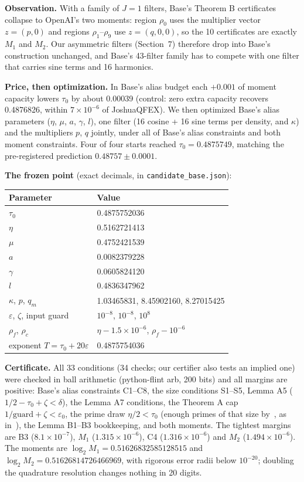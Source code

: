 \documentclass[11pt]{article}
\newcommand{\eps}{\varepsilon}
\theoremstyle{plain}
\begin{document}
\textbf{Observation.} With a family of $J = 1$ filters, Base's Theorem B certificates collapse to OpenAI's two moments: region $\rho_0$ uses the multiplier vector $z = (p, 0)$ and regions $\rho_1$--$\rho_9$ use $z = (q, 0, 0)$, so the 10 certificates are exactly $M_1$ and $M_2$. Our asymmetric filters (Section~7) therefore drop into Base's construction unchanged, and Base's 43-filter family has to compete with one filter that carries sine terms and 16 harmonics.

\textbf{Price, then optimization.} In Base's alias budget each $+0.001$ of moment capacity lowers $\tau_0$ by about 0.00039 (control: zero extra capacity recovers 0.4876826, within $7\times10^{-6}$ of JoshuaQFEX). We then optimized Base's alias parameters ($\eta$, $\mu$, $a$, $\gamma$, $l$), one filter (16 cosine + 16 sine terms per density, and $\kappa$) and the multipliers $p$, $q$ jointly, under all of Base's alias constraints and both moment constraints. Four of four starts reached $\tau_0 = 0.4875749$, matching the pre-registered prediction $0.48757 \pm 0.0001$.

\textbf{The frozen point} (exact decimals, in \texttt{candidate\_base.json}):

\begin{center}
\small
\begin{tabular}{ll}
\toprule
Parameter & Value \\
\midrule
$\tau_0$ & 0.4875752036 \\
$\eta$ & 0.5162721413 \\
$\mu$ & 0.4752421539 \\
$a$ & 0.0082379228 \\
$\gamma$ & 0.0605824120 \\
$l$ & 0.4836347962 \\
$\kappa$, $p$, $q_m$ & 1.03465831, 8.45902160, 8.27015425 \\
$\eps$, $\zeta$, input guard & $10^{-8}$, $10^{-8}$, $10^{8}$ \\
$\rho_f$, $\rho_c$ & $\eta - 1.5\times10^{-6}$, $\rho_f - 10^{-6}$ \\
exponent $T = \tau_0 + 20\eps$ & 0.4875754036 \\
\bottomrule
\end{tabular}
\end{center}

\textbf{Certificate.} All 33 conditions (34 checks; our certifier also tests an implied one) were checked in ball arithmetic (python-flint arb, 200 bits) and all margins are positive: Base's alias constraints C1--C8, the size conditions S1--S5, Lemma A5 ($1/2 - \tau_0 + \zeta < \delta$), the Lemma A7 conditions, the Theorem A cap $1/\mathrm{guard} + \zeta < \eps_0$, the prime draw $\eta/2 < \tau_0$ (enough primes of that size by~\cite[Cor.~3]{rs}, as in~\cite{openai}), the Lemma B1--B3 bookkeeping, and both moments. The tightest margins are B3 ($8.1\times10^{-7}$), $M_1$ ($1.315\times10^{-6}$), C4 ($1.316\times10^{-6}$) and $M_2$ ($1.494\times10^{-6}$). The moments are $\log_2 M_1 = 0.51626832585128515$ and $\log_2 M_2 = 0.51626814726466969$, with rigorous error radii below $10^{-20}$; doubling the quadrature resolution changes nothing in 20 digits.
\end{document}
